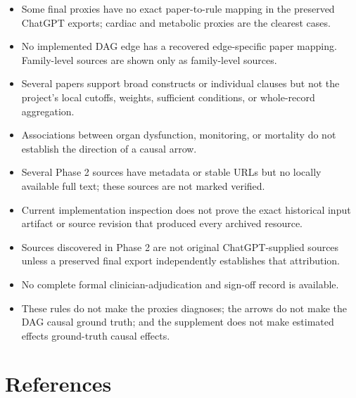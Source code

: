 \documentclass[10pt]{article}
\begin{document}
\begin{itemize}
  \item Some final proxies have no exact paper-to-rule mapping in the preserved
  ChatGPT exports; cardiac and metabolic proxies are the clearest cases.
  \item No implemented DAG edge has a recovered edge-specific paper mapping.
  Family-level sources are shown only as family-level sources.
  \item Several papers support broad constructs or individual clauses but not the
  project's local cutoffs, weights, sufficient conditions, or whole-record aggregation.
  \item Associations between organ dysfunction, monitoring, or mortality do not
  establish the direction of a causal arrow.
  \item Several Phase 2 sources have metadata or stable URLs but no locally available
  full text; these sources are not marked verified.
  \item Current implementation inspection does not prove the exact historical input
  artifact or source revision that produced every archived resource.
  \item Sources discovered in Phase 2 are not original ChatGPT-supplied sources unless
  a preserved final export independently establishes that attribution.
  \item No complete formal clinician-adjudication and sign-off record is available.
  \item These rules do not make the proxies diagnoses; the arrows do not make the DAG
  causal ground truth; and the supplement does not make estimated effects
  ground-truth causal effects.
\end{itemize}

\section{References}



\end{document}
